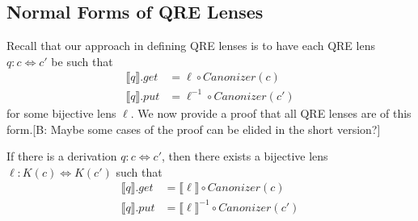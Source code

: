 \documentclass{svproc}
\newcommand{\FINISH}[3]{\ifdraft\textcolor{#1}{[#2: #3]}\fi}
\newcommand{\bcp}[1]{\FINISH{dkred}{B}{#1}}
\newcommand{\canonizer}{\ensuremath{\mathit{Canonizer}}}
\begin{document}
\subsection{Normal Forms of QRE Lenses}
Recall that our approach in defining QRE lenses is to have each QRE lens $q: c
\Leftrightarrow c'$ be such that 
\begin{align*}
\llbracket q \rrbracket.get &= \ell \circ \canonizer(c)\\
\llbracket q \rrbracket.put &= \ell^{-1} \circ
\canonizer(c')
\end{align*}
for some bijective lens $\ell$. We now provide a proof that all QRE lenses are
of this form.\bcp{Maybe some cases of the proof can be elided in the short
  version?} 
\begin{theorem}\label{normal form}
If there is a derivation $q : c \Leftrightarrow c'$, then there exists a
bijective lens $\ell : K(c) \Leftrightarrow K(c')$ such that
\begin{align*}
\llbracket q \rrbracket.get &= \llbracket \ell \rrbracket\circ \canonizer(c)\\
\llbracket q \rrbracket.put &= \llbracket \ell \rrbracket^{-1} \circ
\canonizer(c')
\end{align*}
\end{theorem}
\end{document}
